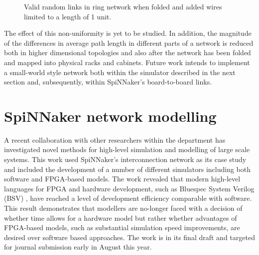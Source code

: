 			\begin{figure}
				\center
				
				\caption[Valid random links in a folded ring network with short
				wires.]{Valid random links in ring network when folded and added wires
				limited to a length of 1 unit.}
				\label{fig:ringNetworkLimitedWires}
			\end{figure}
			
			The effect of this non-uniformity is yet to be studied. In addition, the
			magnitude of the differences in average path length in different parts of
			a network is reduced both in higher dimensional topologies and also after
			the network has been folded and mapped into physical racks and cabinets.
			Future work intends to implement a small-world style network both within
			the simulator described in the next section and, subsequently, within
			SpiNNaker's board-to-board links.
	
	
	\section{SpiNNaker network modelling}
		
		
		A recent collaboration with other researchers within the department has
		investigated novel methods for high-level simulation and modelling of large
		scale systems. This work used SpiNNaker's interconnection network as its
		case study and included the development of a number of different simulators
		including both software and FPGA-based models. The work revealed that modern
		high-level languages for FPGA and hardware development, such as Bluespec
		System Verilog (BSV) \cite{nikhil04}, have reached a level of development
		efficiency comparable with software. This result demonstrates that modellers
		are no-longer faced with a decision of whether time allows for a hardware
		model but rather whether advantages of FPGA-based models, such as
		substantial simulation speed improvements, are desired over software based
		approaches.  The work is in its final draft and targeted for journal
		submission early in August this year.
		
